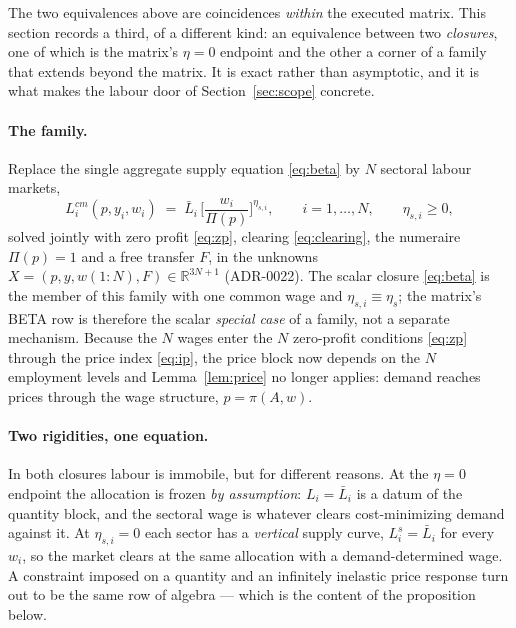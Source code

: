 \documentclass[11pt]{article}
\numberwithin{equation}{section}
\begin{document}
{\color{revisionV2}
The two equivalences above are coincidences \emph{within} the executed matrix.
This section records a third, of a different kind: an equivalence between two
\emph{closures}, one of which is the matrix's $\eta = 0$ endpoint and the other
a corner of a family that extends beyond the matrix. It is exact rather than
asymptotic, and it is what makes the labour door of Section~\ref{sec:scope}
concrete.

\paragraph{The family.} Replace the single aggregate supply equation
\eqref{eq:beta} by $N$ sectoral labour markets,
\begin{equation}
L^{cm}_i(p, y_i, w_i) \;=\; \bar{L}_i\,
   \Big[ \frac{w_i}{\Pi(p)} \Big]^{\eta_{s,i}},
\qquad i = 1, \dots, N, \qquad \eta_{s,i} \geq 0,
\label{eq:etas}
\end{equation}
solved jointly with zero profit \eqref{eq:zp}, clearing \eqref{eq:clearing},
the numeraire $\Pi(p) = 1$ and a free transfer $F$, in the unknowns
$X = (p, y, w(1{:}N), F) \in \mathbb{R}^{3N+1}$ (ADR-0022). The scalar closure
\eqref{eq:beta} is the member of this family with one common wage and
$\eta_{s,i} \equiv \eta_s$; the matrix's BETA row is therefore the scalar
\emph{special case} of a family, not a separate mechanism. Because the $N$
wages enter the $N$ zero-profit conditions \eqref{eq:zp} through the price
index \eqref{eq:ip}, the price block now depends on the $N$ employment levels
and Lemma~\ref{lem:price} no longer applies: demand reaches prices through the
wage structure, $p = \pi(A, w)$.

\paragraph{Two rigidities, one equation.} In both closures labour is immobile,
but for different reasons. At the $\eta = 0$ endpoint the allocation is frozen
\emph{by assumption}: $L_i = \bar{L}_i$ is a datum of the quantity block, and
the sectoral wage is whatever clears cost-minimizing demand against it. At
$\eta_{s,i} = 0$ each sector has a \emph{vertical} supply curve,
$L^s_i = \bar{L}_i$ for every $w_i$, so the market clears at the same
allocation with a demand-determined wage. A constraint imposed on a quantity
and an infinitely inelastic price response turn out to be the same row of
algebra --- which is the content of the proposition below.

}
\end{document}
